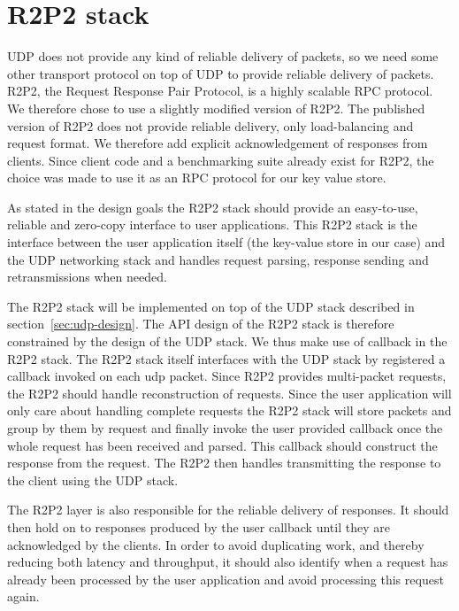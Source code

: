 \documentclass[11pt]{book}
\newcommand{\marios}[1]{\noindent{{\bf \fbox{MK:} {\textcolor{green}{\it#1}}}}}
\begin{document}
\section{R2P2 stack}
\marios{Most of this should be move to the background section. Here you only need the request response API to interface it with the application.}

UDP does not provide any kind of reliable delivery of packets, so we
need some other transport protocol on top of UDP to provide reliable
delivery of packets. R2P2, the Request Response Pair Protocol, is a
highly scalable RPC protocol. We therefore chose to use a slightly
modified version of R2P2. The published version of R2P2 does not
provide reliable delivery, only load-balancing and request format. We
therefore add explicit acknowledgement of responses from
clients. Since client code and a benchmarking suite  already exist for
R2P2, the choice was made to use it as an RPC protocol for our key
value store.

As stated in the design goals the R2P2 stack should provide an
easy-to-use, reliable and zero-copy interface to user
applications. This R2P2 stack is the interface between the user
application itself (the key-value store in our case) and the UDP
networking stack and handles request parsing, response sending and
retransmissions when needed.

The R2P2 stack will be implemented on top of the UDP stack described in
section~\ref{sec:udp-design}. The API design of the R2P2 stack is
therefore constrained by the design of the UDP stack. We thus make use
of callback in the R2P2 stack. The R2P2 stack itself interfaces with
the UDP stack by registered a callback invoked on each udp
packet. Since R2P2 provides multi-packet requests, the R2P2 should
handle reconstruction of requests. Since the user application will
only care about handling complete requests the R2P2 stack will store
packets and group by them by request and finally invoke the user
provided callback once the whole request has been received and
parsed. This callback should construct the response from the
request. The R2P2 then handles transmitting the response to the client
using the UDP stack.

The R2P2 layer is also responsible for the reliable delivery of
responses. It should then hold on to responses produced by the user
callback until they are acknowledged by the clients. In order to avoid
duplicating work, and thereby reducing both latency and throughput,
it should also identify when a request has already been processed by
the user application and avoid processing this request again.
\end{document}

